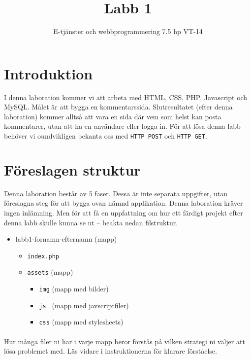 \documentclass[12pt]{article}
\date{}
\title{ Labb 1 }
\author{ E-tjänster och webbprogrammering 7.5 hp VT-14 }
\begin{document}
\maketitle
\vspace{-2em}



\section{Introduktion}
I denna laboration kommer vi att arbeta med HTML, CSS, PHP, Javascript och MySQL. Målet är att bygga en kommentarssida. Slutresultatet (efter denna laboration) kommer alltså att vara en sida där vem som helst kan posta kommentarer, utan att ha en användare eller logga in. För att lösa denna labb behöver vi oundvikligen bekanta oss med \texttt{HTTP POST} och \texttt{HTTP GET}.


\section{Föreslagen struktur}
Denna laboration består av 5 faser. Dessa är inte separata uppgifter, utan föreslagna steg för att bygga ovan nämnd applikation. Denna laboration kräver ingen inlämning. Men för att få en uppfattning om hur ett färdigt projekt efter denna labb skulle kunna se ut -- beakta nedan filstruktur.
  \begin{itemize}
    \item labb1-fornamn-efternamn (mapp)
    \begin{itemize}
      \item \texttt{index.php} 
      \item \texttt{assets} (mapp)
      \begin{itemize}
        \item \texttt{img} (mapp med bilder)
        \item \texttt{js  } (mapp med javscriptfiler)
        \item \texttt{css} (mapp med stylesheets)
      \end{itemize}
    \end{itemize}
  \end{itemize}

\paragraph{}
Hur många filer ni har i varje mapp beror förstås på vilken strategi ni väljer att lösa problemet med. Läs vidare i instruktionerna för klarare förståelse.
\end{document}

